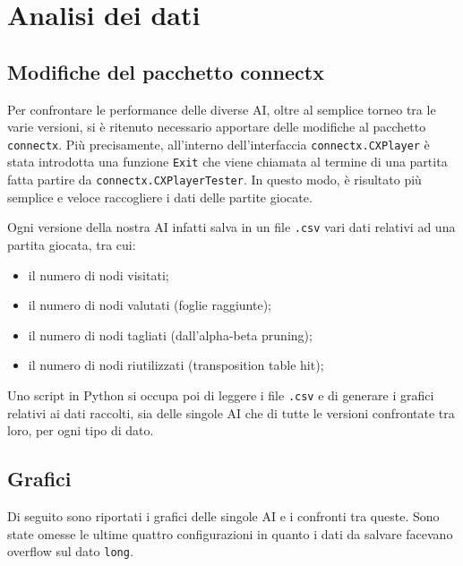 \chapter{Analisi dei dati}

\section{Modifiche del pacchetto connectx}
Per confrontare le performance delle diverse AI, oltre al semplice torneo tra le varie versioni, si è ritenuto necessario apportare delle modifiche al pacchetto \verb!connectx!.
Più precisamente, all'interno dell'interfaccia \verb!connectx.CXPlayer! è stata introdotta una funzione \verb!Exit! che viene chiamata al termine di una partita fatta partire da \verb!connectx.CXPlayerTester!.
In questo modo, è risultato più semplice e veloce raccogliere i dati delle partite giocate.

Ogni versione della nostra AI infatti salva in un file \verb!.csv! vari dati relativi ad una partita giocata, tra cui:
\begin{itemize}
    \item il numero di nodi visitati;
    \item il numero di nodi valutati (foglie raggiunte);
    \item il numero di nodi tagliati (dall'alpha-beta pruning);
    \item il numero di nodi riutilizzati (transposition table hit);
\end{itemize}

Uno script in Python si occupa poi di leggere i file \verb!.csv! e di generare i grafici relativi ai dati raccolti, sia delle singole AI che di tutte le versioni confrontate tra loro, per ogni tipo di dato.

\section{Grafici}

Di seguito sono riportati i grafici delle singole AI e i confronti tra queste. Sono state omesse le ultime quattro configurazioni in quanto i dati da salvare facevano overflow sul dato \verb!long!.

